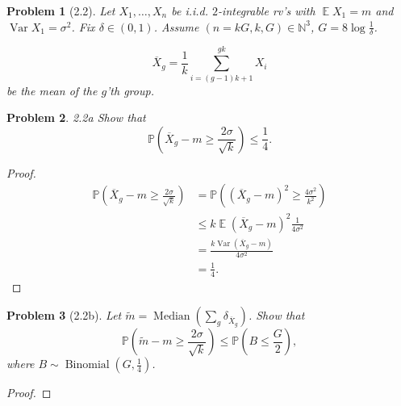 \documentclass{article}
\newtheorem{problem}{Problem}
\newcommand{\expect}{\operatorname{\mathbb{E}}}
\begin{document}
\begin{problem}[2.2]
Let \( X_1, \ldots, X_n \)
be i.i.d. \( 2 \)-integrable rv's
with \( \expect X_1 = m \)
and \( \operatorname{Var}X_1 = \sigma^2 \).
Fix \( \delta\in(0,1) \).
Assume \( (n=kG, k, G)\in \mathbb{N}^3 \),
\( G = 8\log\frac1\delta \).

\[
\overline{X}_g = \frac1k \sum_{i=(g-1)k+1}^{gk} X_i
\]
be the mean of the \( g \)'th group.
\end{problem}
\begin{problem}{2.2a}
Show that \[
\mathbb{P}(\overline{X}_g - m \geq \frac{2\sigma}{\sqrt{k}}) \leq \frac14.
\]
\end{problem}
\begin{proof}
\[\begin{split}
\mathbb{P}\left(\overline{X}_g - m \geq \frac{2\sigma}{\sqrt{k}}\right)
&= \mathbb{P}\left((\overline{X}_g - m)^2 \geq \frac{4\sigma^2}{k^2}\right) \\
&\leq k\expect(\overline{X}_g - m)^2\frac{1}{4\sigma^2} \\
&= \frac{k\operatorname{Var}(\overline{X}_g - m)}{4\sigma^2} \\
&= \frac14.
\end{split}\]

\end{proof}

\begin{problem}[2.2b]
Let \( \tilde{m} = \operatorname{Median}(\sum_g \delta_{\overline{X}_g}) \).
Show that
\[
\mathbb{P}\left(\tilde{m} - m \geq \frac{2\sigma}{\sqrt{k}}\right)
\leq \mathbb{P}(B \leq \frac{G}{2}),
\]
where \( B\sim\operatorname{Binomial}(G, \frac14) \).
\end{problem}
\begin{proof}
\end{proof}
\end{document}
